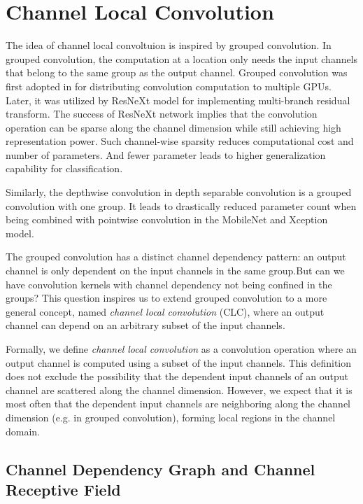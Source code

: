 \documentclass[10pt,twocolumn,letterpaper]{article}
\begin{document}
\section{Channel Local Convolution}

The idea of channel local convoltuion is inspired by grouped convolution. In grouped convolution, the computation at a location only needs the input channels that belong to the same group as the output channel. Grouped convolution was first adopted in \cite{alexnet2012krizhevsky} for distributing convolution computation to multiple GPUs.  Later, it was utilized by ResNeXt\cite{resnext2016saining} model for implementing multi-branch residual transform. The success of ResNeXt network implies that the convolution operation can be sparse along the channel dimension while still achieving high representation power. Such channel-wise sparsity reduces computational cost and number of parameters. And fewer parameter leads to higher generalization capability for classification. 

Similarly, the depthwise convolution in depth separable convolution is a grouped convolution with one group. It leads to drastically reduced parameter count when being combined with pointwise convolution in the MobileNet\cite{mobilenet2017howard} and Xception\cite{xception2017chollet} model.

The grouped convolution has a distinct channel dependency pattern: an output channel is only dependent on the input channels in the same group.But can we have convolution kernels with channel dependency not being confined in the groups? This question inspires us to extend grouped convolution to a more general concept, named \textit{channel local convolution} (CLC), where an output channel can depend on an arbitrary subset of the input channels. 

Formally, we define \textit{channel local convolution }as a convolution operation where an output channel is computed using a subset of the input channels. This definition does not exclude the possibility that the dependent input channels of an output channel are scattered along the channel dimension. However, we expect that it is most often that the dependent input channels are neighboring along the channel dimension (e.g. in grouped convolution), forming local regions in the channel domain. 

\subsection{Channel Dependency Graph and Channel Receptive Field}
\end{document}
